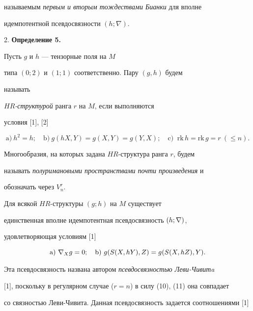 называемым {\it первым и вторым тождествами Бианки} для вполне


идемпотентной псевдосвязности $(h;\nabla)$.


\medskip





2. {\bf Определение 5.}


Пусть $g$ и $h$ --- тензорные поля на $M$


типа $(0; 2)$ и $(1; 1)$ соответственно. Пару $(g, h)$ будем


называть


{\it $HR$-структурой} ранга $r$ на $M $, если выполняются


условия [1], [2]


\begin{equation}


\mathrm a) \ h^2=h;\quad \mathrm b) \ g (hX, Y)=g (X, Y)=g (Y, X); \quad


\mathrm c) \ \text { rk} \, h=\text {rk} \, g=r \ (\le n).


\end{equation}


Многообразия, на которых задана $HR$-структура ранга $r$, будем


называть {\it полуримановыми пространствами почти произведения} и


обозначать через $V^r_n$.


\medskip


\addtocounter{defn}{1}





Для всякой $HR$-структуры $(g; h)$ на $M$ существует


единственная вполне идемпотентная псевдосвязность $(h; \nabla)$,


удовлетворяющая условиям [1]


\begin{equation}


\mathrm a)\ \nb_{X} g=0;\quad


\mathrm b)\ g (S (X, hY), Z)=g (S (X, hZ), Y).


\end{equation}


Эта псевдосвязность названа автором {\it псевдосвязностью Леви-Чивитa}


[1], поскольку в регулярном случае ($r=n$) в силу (10), (11) она совпадает


со связностью Леви-Чивита. Данная псевдосвязность задается соотношениями [1]


